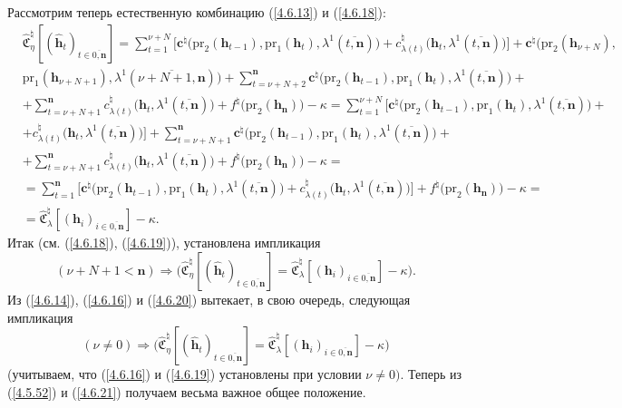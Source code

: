 \documentclass[12pt]{report}
\newcommand{\bfn}{\begin{equation}}
\newcommand{\efn}{\end{equation}}
\newcommand{\ov}{\overline}
\newcommand{\la}{\lambda}
\newcommand{\zc}{{\mathbf c}}
\newcommand{\nn}{{\mathbf n}}
\begin{document}
{{Рассмотрим теперь естественную комбинацию (\ref{4.6.13}) и (\ref{4.6.18}):
\begin{eqnarray}
&\widehat{\mathfrak{C}}_\eta^\natural[(\hat{\mathbf{h}}_t)_{t\in\ov{0,\nn}}]=
 \sum\limits_{t=1}^{\nu+N}\bigl[\zc^\natural\bigl(\mathrm{pr}_2(\mathbf{h}_{t-1}),\mathrm{pr}_1
 (\mathbf{h}_t), \la^1(\ov{t,\nn})\bigl) + c_{\la(t)}^\natural\bigl(\mathbf{h}_t,\la^1(\ov{t,\nn})\bigl)\bigl] +
\zc^\natural\bigl(\mathrm{pr}_2(\mathbf{h}_{\nu+N}),
 &\nonumber\\
&\mathrm{pr}_1(\mathbf{h}_{\nu+N+1}), \la^1(\ov{\nu+N+1,\nn})\bigl)+
\sum\limits_{t=\nu+N+2}^\nn\zc^\natural\bigl(\mathrm{pr}_2(\mathbf{h}_{t-1}),\mathrm{pr}_1
(\mathbf{h}_t), \la^1(\ov{t,\nn})\bigl) +
&\nonumber\\
&+ \sum\limits_{t=\nu+N+1}^\nn c_{\la(t)}^\natural\bigl(\mathbf{h}_t,\la^1(\ov{t,\nn})\bigl)
+f^\natural\bigl(\mathrm{pr}_2(\mathbf{h}_\nn)\bigl) - \kappa = \sum\limits_{t=1}^{\nu+N}\bigl[\zc^\natural
(\mathrm{pr}_2(\mathbf{h}_{t-1}),\mathrm{pr}_1(\mathbf{h}_t), \la^1(\ov{t,\nn})\bigl) +
&\nonumber\\
&+c_{\la(t)}^{\natural}\bigl(\mathbf{h}_t,\la^1(\ov{t,\nn})\bigl)\bigl]
+\sum\limits_{t=\nu+N+1}^\nn\zc^\natural\bigl(\mathrm{pr}_2(\mathbf{h}_{t-1}),\mathrm{pr}_1
(\mathbf{h}_t),\la^1(\ov{t,\nn})\bigl) +
&\nonumber\\
&+\sum\limits_{t=\nu+N+1}^\nn c_{\la(t)}^\natural\bigl(\mathbf{h}_t,\la^1(\ov{t,\nn})\bigl)
+f^\natural\bigl(\mathrm{pr}_2(\mathbf{h}_\nn)\bigl) - \kappa  =
&\nonumber\\
&=\sum\limits_{t=1}^\nn \bigl[\zc^\natural\bigl(\mathrm{pr}_2(\mathbf{h}_{t-1}),\mathrm{pr}_1(\mathbf{h}_t),
\la^1(\ov{t,\nn})\bigl) + c_{\la(t)}^\natural(\mathbf{h}_t,\la^1(\ov{t,\nn})\bigl)\bigl] +
f^\natural\bigl(\mathrm{pr}_2(\mathbf{h}_\nn)\bigl) - \kappa=
&\nonumber\\
&= \widehat{\mathfrak{C}}_\la^\natural[(\mathbf{h}_i)_{i\in\ov{0,\nn}}]
 - \kappa.
&\label{4.6.19}
\end{eqnarray}
Итак (см. (\ref{4.6.18}), (\ref{4.6.19})), установлена импликация
\bfn\label{4.6.20}
(\nu+N+1 < \nn)\Longrightarrow \bigl(\widehat{\mathfrak{C}}_\eta^\natural[(\hat{\mathbf{h}}_t)_{t\in\ov{0,\nn}}] =
\widehat{\mathfrak{C}}_\la^\natural[(\mathbf{h}_i)_{i\in\ov{0,\nn}}]  - \kappa\bigl).
\efn
Из (\ref{4.6.14}), (\ref{4.6.16}) и (\ref{4.6.20}) вытекает, в свою очередь, следующая импликация
\bfn\label{4.6.21}(\nu\neq 0) \Longrightarrow
\bigl(\widehat{\mathfrak{C}}_\eta^\natural[(\hat{\mathbf{h}}_t)_{t\in\ov{0,\nn}}] =
\widehat{\mathfrak{C}}_\la^\natural[(\mathbf{h}_i)_{i\in\ov{0,\nn}}]  - \kappa\bigl)
\efn
(учитываем, что (\ref{4.6.16}) и (\ref{4.6.19}) установлены при условии $\nu \neq 0).$
Теперь из (\ref{4.5.52}) и (\ref{4.6.21}) получаем весьма важное общее положение.

}}
\end{document}
